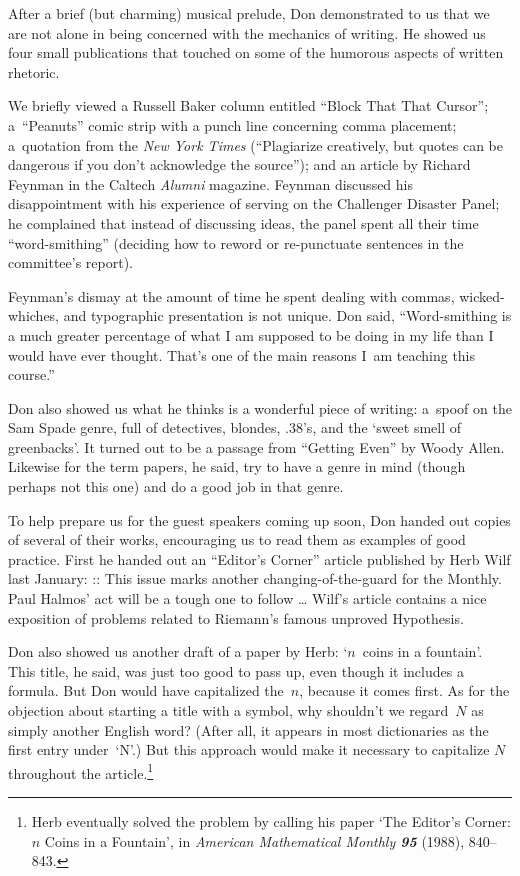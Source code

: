 After a brief (but charming) musical prelude, Don demonstrated to us
that we are not alone in being concerned with the mechanics of writing. He
showed us four small publications that touched on some of the humorous
aspects of written rhetoric.  

We briefly viewed a Russell Baker column entitled ``Block That That  Cursor'';
a~``Peanuts'' comic strip with a punch line concerning comma placement;
a~quotation from the {\sl New York Times\/} (``Plagiarize creatively,
but quotes can be dangerous if you don't
acknowledge the source''); and an article by Richard Feynman in the Caltech
{\sl Alumni\/} magazine.  Feynman discussed his disappointment with his experience
of serving on the Challenger Disaster Panel; he complained that instead
of discussing ideas, the panel spent all their time ``word-smithing''
(deciding how to reword or re-punctuate sentences in the committee's
report).

Feynman's dismay at the amount of time he spent dealing with commas,
wicked-whiches, and typographic presentation is not unique.  Don said,
``Word-smithing is a much greater percentage of what I am supposed to be
doing in my life than I would have ever thought. That's one of the
main reasons I~am teaching this course.''

Don also showed us what he thinks is a wonderful piece of writing: a~spoof
on the Sam Spade genre, full of detectives, blondes, .38's, and the
`sweet smell of greenbacks'. It turned out to be a passage from
``Getting Even'' by Woody Allen. Likewise for the term papers, he said,
try to have a genre in mind (though perhaps not this one) and do a
good job in that genre.

To help prepare us for the guest speakers coming up soon, Don
handed out copies of several of their works, encouraging us to read them
as examples of good practice. First he handed out
an ``Editor's Corner'' article published by Herb Wilf last January:
\smallskip
\display 20pt::
  This issue marks another changing-of-the-guard for the {\sc Monthly}.
  Paul Halmos' act will be a tough one to follow \dots
\smallskip
Wilf's article contains a nice exposition of problems related to
Riemann's famous unproved Hypothesis.

Don also showed us
another draft of a paper by Herb: `$n$~coins in a fountain'. This
title, he said, was just too good to pass up, even though it includes
a formula. But Don would have capitalized the~$n$, because it comes
first. As for the objection about starting a title with a symbol,
why shouldn't we regard~$N$ as simply another English word? (After all,
it appears in most dictionaries as the first entry under~`N'.)
But this approach would make it necessary to capitalize $N$
throughout the article.\footnote*{Herb eventually solved the problem
by calling his paper `The Editor's Corner: $n$ Coins in a Fountain',
in {\sl American Mathematical Monthly\/ \bf95} (1988), 840--843.}

